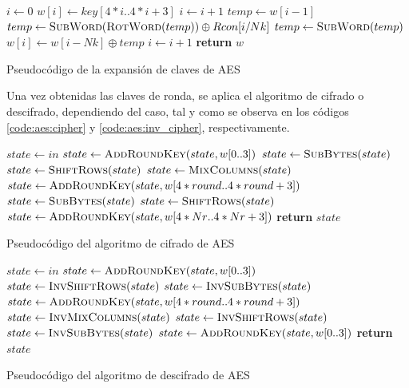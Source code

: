 \documentclass[11pt]{article}
\renewcommand*\Call[2]{\textproc{#1}(#2)}
\begin{document}
\begin{listing}[h] %
\begin{algorithmic}
    \State $i \gets 0$
        \State $w[i] \gets key[4*i\text{..}4*i+3]$
        \State $i \gets i+1$
    \EndWhile
        \State $temp \gets w[i-1]$
        \State $temp \gets \Call{SubWord}{\Call{RotWord}{temp}} \oplus Rcon[i/Nk]$
            \State $temp \gets \Call{SubWord}{temp}$
        \EndIf
        \State $w[i] \gets w[i-Nk] \oplus temp$
        \State $i \gets i+1$
    \EndWhile
    \State \textbf{return} $w$
\EndProcedure
\end{algorithmic}
\caption{Pseudocódigo de la expansión de claves de AES}
\label{code:aes:key_expansion}
\end{listing}

Una vez obtenidas las claves de ronda, se aplica el algoritmo de cifrado o descifrado, dependiendo del caso, tal y como se observa en los códigos \ref{code:aes:cipher} y \ref{code:aes:inv_cipher}, respectivamente.

\begin{listing}[h] %
\begin{algorithmic}
    \State $state \gets in$
    \State $state \gets \Call{AddRoundKey}{state, w[0\text{..}3]}$
        \State $state \gets \Call{SubBytes}{state}$
        \State $state \gets \Call{ShiftRows}{state}$
        \State $state \gets \Call{MixColumns}{state}$
        \State $state \gets \Call{AddRoundKey}{state, w[4*round\text{..}4*round + 3]}$
    \EndFor
    \State $state \gets \Call{SubBytes}{state}$
    \State $state \gets \Call{ShiftRows}{state}$
    \State $state \gets \Call{AddRoundKey}{state,w[4*Nr\text{..}4*Nr+3]}$
    \State \textbf{return} $state$
\EndProcedure
\end{algorithmic}
\caption{Pseudocódigo del algoritmo de cifrado de AES}
\label{code:aes:cipher}
\end{listing}

\begin{listing}[h] %
\begin{algorithmic}
    \State $state \gets in$
    \State $state \gets \Call{AddRoundKey}{state, w[0\text{..}3]}$
        \State $state \gets \Call{InvShiftRows}{state}$
        \State $state \gets \Call{InvSubBytes}{state}$
        \State $state \gets \Call{AddRoundKey}{state, w[4*round\text{..}4*round + 3]}$
        \State $state \gets \Call{InvMixColumns}{state}$
    \EndFor
    \State $state \gets \Call{InvShiftRows}{state}$
    \State $state \gets \Call{InvSubBytes}{state}$
    \State $state \gets \Call{AddRoundKey}{state,w[0\text{..}3]}$
    \State \textbf{return} $state$
\EndProcedure
\end{algorithmic}
\caption{Pseudocódigo del algoritmo de descifrado de AES}
\label{code:aes:inv_cipher}
\end{listing}
\end{document}
